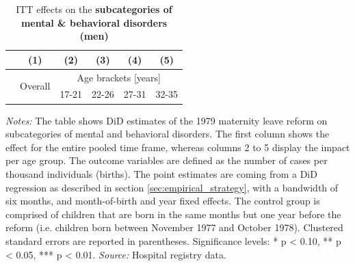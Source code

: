 \documentclass[11pt, a4paper,draft]{article} %
\begin{document}
\newpage
{} 
\vspace*{\fill}
\begin{table}[H] \centering 
	\begin{threeparttable} \centering \caption{ITT effects on the \textbf{subcategories of mental \& behavioral disorders (men)}}\label{tab: ITT_across_d5subcategories_per_age_group_men}
		{\def\sym#1{\ifmmode^{#1}\else\(^{#1}\)\fi} 
			\begin{tabular}{l*{5}{c}}
				\toprule 
				&\multicolumn{1}{c}{(1)}&\multicolumn{1}{c}{(2)}&\multicolumn{1}{c}{(3)}&\multicolumn{1}{c}{(4)}&\multicolumn{1}{c}{(5)}\\
				\midrule
				&\multirow{2}{*}{Overall} & \multicolumn{4}{c}{Age brackets [years]} \\ 
				\cmidrule(lr){3-6}
				&&\multicolumn{1}{c}{17-21}&\multicolumn{1}{c}{22-26}&\multicolumn{1}{c}{27-31}&\multicolumn{1}{c}{32-35}\\
				
				\midrule
				
				
				
				\bottomrule 
		\end{tabular}}
	\end{threeparttable} 
	\begin{minipage}{0.9\linewidth}
		\scriptsize \emph{Notes:} The table shows DiD estimates of the 1979 maternity leave reform on subcategories of mental and behavioral disorders. The first column shows the effect for the entire pooled time frame, whereas columns 2 to 5 display the impact per age group. The outcome variables are defined as the number of cases per thousand individuals (births). The point estimates are coming from a DiD regression as described in section \ref{sec:empirical_strategy}, with a bandwidth of six months, and month-of-birth and year fixed effects. The control group is comprised of children that are born in the same months but one year before the reform (i.e. children born between November 1977 and October 1978). Clustered standard errors are reported in parentheses. \newline Significance levels: * p < 0.10, ** p < 0.05, *** p < 0.01. \newline 	\emph{Source:} Hospital registry data.
	\end{minipage}
\end{table} 
\vspace*{\fill}\clearpage 
\restoregeometry
\end{document}
